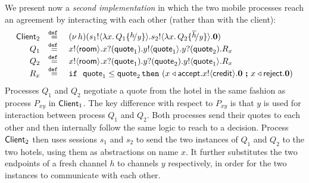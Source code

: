 We present now a \emph{second  implementation}
in which the two mobile processes reach an agreement
by interacting with each other (rather than with the client):
%
\[
	\begin{array}{rcl}
		\Client_2 &\defeq& \newsp{h}{\bout{s_1}{\abs{x}{Q_1 \subst{h}{y}}} \bout{s_2}{\abs{x}{Q_2 \subst{\dual{h}}{y}}} \inact}
\\
		Q_1 &\defeq&	\bout{x}{\rtype} \binp{x}{\Quote_1} \bout{y}{\Quote_1} \binp{y}{\Quote_2} R_x \\
		Q_2 &\defeq&	\bout{x}{\rtype} \binp{x}{\Quote_1} \binp{y}{\Quote_2} \bout{y}{\Quote_1} R_x \\
			    R_x & \defeq & \If\ \Quote_1 \leq \Quote_2 \, \Then  (\bsel{x}{\accept} \bout{x}{\creditc} \inact \  \Else \ \bsel{x}{\reject} \inact)
	\end{array}
\]
Processes $Q_1$ and $Q_2$  negotiate a quote from the
		hotel in the same fashion as process $P_{xy}$ in $\mathsf{Client}_1$.
		The key difference with respect to $P_{xy}$ is that $y$ is used for
		interaction between process $Q_1$ and $Q_2$. Both processes send
		their quotes to each other and then internally follow the same
		logic to reach to a decision.
		Process  $\mathsf{Client}_2$ then uses sessions $s_1$ and $s_2$ to send the two
		instances of $Q_1$ and $Q_2$ to the two hotels, using them 
	 as abstractions
		on name $x$. It further substitutes
		the two endpoints of a fresh channel $h$ to channels $y$ respectively,
		in order for the two instances to communicate with each other.



